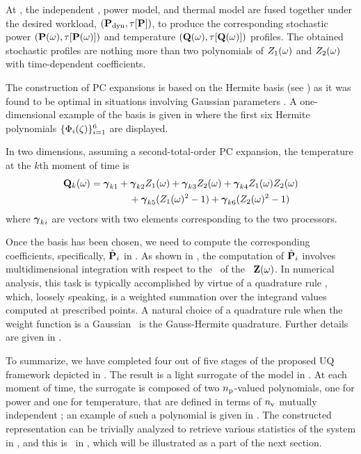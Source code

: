 At , the independent \rvs, power model, and thermal model are fused together under the desired workload, $\profilePdyn$, to produce the corresponding stochastic power $\profileP{\o}$ and temperature $\profileT{\o}$ profiles. The obtained stochastic profiles are nothing more than two polynomials of $Z_1(\omega)$ and $Z_2(\omega)$ with time-dependent coefficients.

The construction of PC expansions is based on the Hermite basis (see ) as it was found to be optimal in situations involving Gaussian parameters \cite{xiu2010}.
A one-dimensional example of the basis is given in  where the first six Hermite polynomials $\{ \Phi_i(\zeta) \}_{i = 1}^6$ are displayed.

In two dimensions, assuming a second-total-order PC expansion, the temperature at the $k$th moment of time is
\begin{align*}
  \mathbf{Q}_k(\omega) &= {\boldsymbol\gamma}_{k1} + {\boldsymbol\gamma}_{k2} Z_1(\omega) + {\boldsymbol\gamma}_{k3} Z_2(\omega) + {\boldsymbol\gamma}_{k4} Z_1(\omega) Z_2(\omega) \\
  & \qquad \qquad {} + {\boldsymbol\gamma}_{k5} (Z_1(\omega)^2 - 1) + {\boldsymbol\gamma}_{k6} (Z_2(\omega)^2 - 1)
\end{align*}
where ${\boldsymbol\gamma}_{ki}$ are vectors with two elements corresponding to the two processors.

Once the basis has been chosen, we need to compute the corresponding coefficients, specifically, $\hat{\mathbf{P}}_i$ in . As shown in , the computation of $\hat{\mathbf{P}}_i$ involves multidimensional integration with respect to the \pdf\ of the \rvs\ $\mathbf{Z}(\omega)$.
In numerical analysis, this task is typically accomplished by virtue of a quadrature rule \cite{press2007}, which, loosely speaking, is a weighted summation over the integrand values computed at prescribed points. A natural choice of a quadrature rule when the weight function is a Gaussian \pdf\ is the Gauss-Hermite quadrature. Further details are given in .

To summarize, we have completed four out of five stages of the proposed UQ framework depicted in . The result is a light surrogate of the model in . At each moment of time, the surrogate is composed of two ${n_\text{p}}$-valued polynomials, one for power and one for temperature, that are defined in terms of ${n_\text{v}}$ mutually independent \rvs; an example of such a polynomial is given in . The constructed representation can be trivially analyzed to retrieve various statistics of the system in , and this is \ in , which will be illustrated as a part of the next section.

